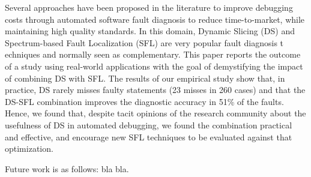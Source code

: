 \documentclass{article}
\begin{document}
Several approaches have been proposed in the literature to improve debugging
costs through automated software fault diagnosis to reduce time-to-market,
while maintaining high quality standards. In this domain, Dynamic Slicing (DS)
and Spectrum-based Fault Localization (SFL) are very popular fault diagnosis t
echniques and normally seen as complementary. This paper reports the outcome of
a study using real-world applications with the goal of demystifying the impact
of combining DS with SFL. The results of our empirical study show that, in
practice, DS rarely misses faulty statements (23 misses in 260 cases) and that
the DS-SFL combination improves the diagnostic accuracy in 51\% of the faults.
Hence, we found that, despite tacit opinions of the research community about
the usefulness of DS in automated debugging, we found the combination practical
and effective, and encourage new SFL techniques to be evaluated against that
optimization.

Future work is as follows: bla bla.

%
{
  \small
  \balance
  
  
}
\end{document}
